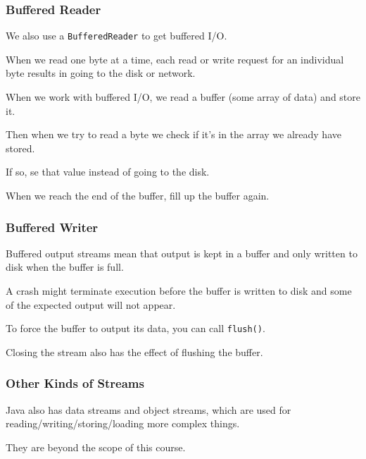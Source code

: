 \begin{frame}
\frametitle{Buffered Reader}
\begin{changemargin}{1cm}

We also use a \texttt{BufferedReader} to get buffered I/O. 

When we read one byte at a time, each read or write request for an individual byte results in going to the disk or network.

When we work with buffered I/O, we read a buffer (some array of data) and store it. 

Then when we try to read a byte we check if it's in the array we already have stored. 

If so, se that value instead of going to the disk. 

When we reach the end of the buffer, fill up the buffer again.

\end{changemargin}
\end{frame}


\begin{frame}
\frametitle{Buffered Writer}
\begin{changemargin}{1cm}

Buffered output streams mean that output is kept in a buffer and only written to disk when the buffer is full. 

A crash might terminate execution before the buffer is written to disk and some of the expected output will not appear. 

To force the buffer to output its data, you can call \texttt{flush()}.

Closing the stream also has the effect of flushing the buffer.

\end{changemargin}
\end{frame}


\begin{frame}
\frametitle{Other Kinds of Streams}
\begin{changemargin}{1cm}

Java also has data streams and object streams, which are used for reading/writing/storing/loading more complex things. 

They are beyond the scope of this course.
\end{changemargin}
\end{frame}










